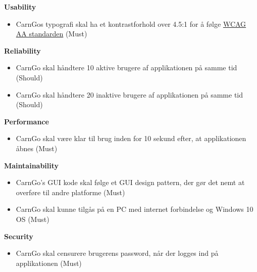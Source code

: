 \documentclass[Rapport/Rapport_main.tex]{subfiles}
\begin{document}
\textbf{Usability}
\begin{itemize}
    \item CarnGos typografi skal ha et kontrastforhold over 4.5:1 for å følge  \href{https://www.w3.org/TR/UNDERSTANDING-WCAG20/conformance.html#uc-levels-head}{WCAG AA standarden} (Must)
\end{itemize}


\textbf{Reliability}
 \begin{itemize}
     \item CarnGo skal håndtere 10 aktive brugere af applikationen på samme tid (Should)
     \item CarnGo skal håndtere 20 inaktive brugere af applikationen på samme tid (Should)
 \end{itemize}


\textbf{Performance}
\begin{itemize}
    \item CarnGo skal være klar til brug inden for 10 sekund efter, at applikationen åbnes (Must)
\end{itemize}


\textbf{Maintainability}
\begin{itemize}
    \item CarnGo's GUI kode skal følge et GUI design pattern, der gør det nemt at overføre til andre platforme (Must)
    \item CarnGo skal kunne tilgås på en PC med internet forbindelse og Windows 10 OS (Must)
\end{itemize}


\textbf{Security}
\begin{itemize}
    \item CarnGo skal censurere brugerens password, når der logges ind på applikationen (Must)
\end{itemize}
\end{document}
